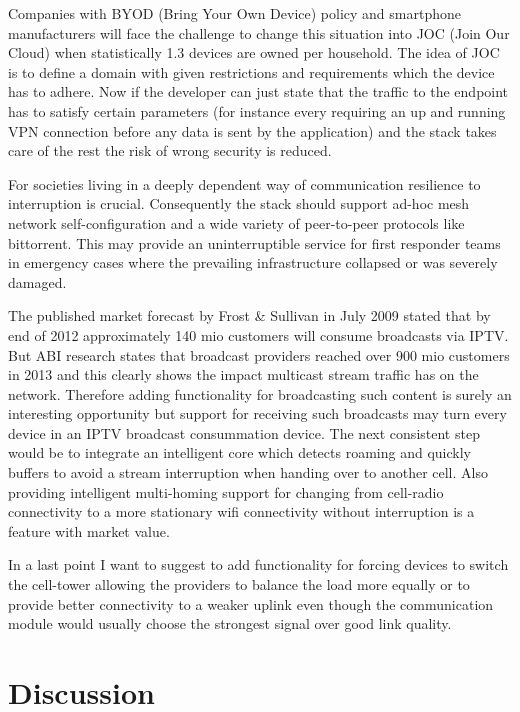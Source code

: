 \documentclass[twocolumn,english]{IEEEtran}
\theoremstyle{plain}
\theoremstyle{plain}
\begin{document}
Companies with BYOD (Bring Your Own Device) policy and smartphone
manufacturers will face the challenge to change this situation into JOC (Join
Our Cloud) when statistically 1.3 devices are owned per
household\cite{gartner:predicts-2014-cognizant-computing}. The idea of JOC is
to define a domain with given restrictions and requirements which the device
has to adhere. Now if the developer can just state that the traffic to the
endpoint has to satisfy certain parameters (for instance every requiring an up
and running VPN connection before any data is sent by the application) and the
stack takes care of the rest the risk of wrong security is reduced.

For societies living in a deeply dependent way of communication resilience to
interruption is crucial. Consequently the stack should support ad-hoc mesh
network self-configuration and a wide variety of peer-to-peer protocols like
bittorrent. This may provide an uninterruptible service for first responder
teams in emergency cases where the prevailing infrastructure collapsed or was
severely damaged.

The published market forecast by Frost \& Sullivan in July
2009\cite{frost:iptv-market} stated that by end of 2012 approximately 140 mio
customers will consume broadcasts via IPTV. But ABI research states that
broadcast providers reached over 900 mio customers in
2013\cite{abi:iptv-marketshare} and this clearly shows the impact multicast
stream traffic has on the network.  Therefore adding functionality for
broadcasting such content is surely an interesting opportunity but support for
receiving such broadcasts may turn every device in an IPTV broadcast
consummation device. The next consistent step would be to integrate an
intelligent core which detects roaming and quickly buffers to avoid a stream
interruption when handing over to another cell. Also providing intelligent
multi-homing support for changing from cell-radio connectivity to a more
stationary wifi connectivity without interruption is a feature with market
value.

In a last point I want to suggest to add functionality for forcing devices to
switch the cell-tower allowing the providers to balance the load more equally
or to provide better connectivity to a weaker uplink even though the
communication module would usually choose the strongest signal over good link
quality.

\section{Discussion}
\end{document}
